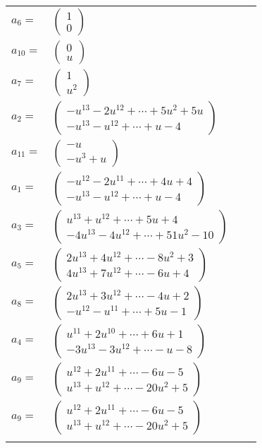 \documentclass[1p]{elsarticle_modified}
\theoremstyle{definition}
\begin{document}
\begin{tabular}{m{7pt} m{180pt} m{7pt} m{180pt} }
\flushright $a_{6}=$&$\begin{pmatrix}1\\0\end{pmatrix}$ \\
\flushright $a_{10}=$&$\begin{pmatrix}0\\u\end{pmatrix}$ \\
\flushright $a_{7}=$&$\begin{pmatrix}1\\u^2\end{pmatrix}$ \\
\flushright $a_{2}=$&$\begin{pmatrix}- u^{13}-2 u^{12}+\cdots+5 u^2+5 u\\- u^{13}- u^{12}+\cdots+u-4\end{pmatrix}$ \\
\flushright $a_{11}=$&$\begin{pmatrix}- u\\- u^3+u\end{pmatrix}$ \\
\flushright $a_{1}=$&$\begin{pmatrix}- u^{12}-2 u^{11}+\cdots+4 u+4\\- u^{13}- u^{12}+\cdots+u-4\end{pmatrix}$ \\
\flushright $a_{3}=$&$\begin{pmatrix}u^{13}+u^{12}+\cdots+5 u+4\\-4 u^{13}-4 u^{12}+\cdots+51 u^2-10\end{pmatrix}$ \\
\flushright $a_{5}=$&$\begin{pmatrix}2 u^{13}+4 u^{12}+\cdots-8 u^2+3\\4 u^{13}+7 u^{12}+\cdots-6 u+4\end{pmatrix}$ \\
\flushright $a_{8}=$&$\begin{pmatrix}2 u^{13}+3 u^{12}+\cdots-4 u+2\\- u^{12}- u^{11}+\cdots+5 u-1\end{pmatrix}$ \\
\flushright $a_{4}=$&$\begin{pmatrix}u^{11}+2 u^{10}+\cdots+6 u+1\\-3 u^{13}-3 u^{12}+\cdots- u-8\end{pmatrix}$ \\
\flushright $a_{9}=$&$\begin{pmatrix}u^{12}+2 u^{11}+\cdots-6 u-5\\u^{13}+u^{12}+\cdots-20 u^2+5\end{pmatrix}$\\ \flushright $a_{9}=$&$\begin{pmatrix}u^{12}+2 u^{11}+\cdots-6 u-5\\u^{13}+u^{12}+\cdots-20 u^2+5\end{pmatrix}$\\&\end{tabular}
\end{document}
